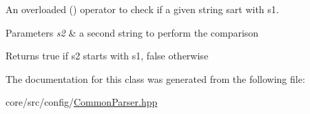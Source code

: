 An overloaded () operator to check if a given string sart with s1. 


\begin{DoxyParams}{Parameters}
{\em s2} & a second string to perform the comparison \\
\hline
\end{DoxyParams}
\begin{DoxyReturn}{Returns}
true if s2 starts with s1, false otherwise 
\end{DoxyReturn}


The documentation for this class was generated from the following file:\begin{DoxyCompactItemize}
\item 
core/src/config/\hyperlink{CommonParser_8hpp}{CommonParser.hpp}\end{DoxyCompactItemize}
